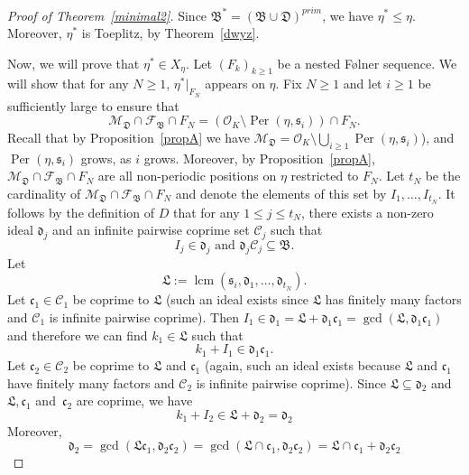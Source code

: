 \documentclass[leqno,a4paper,12pt]{article}
\DeclareMathOperator{\lcm}{lcm}
\theoremstyle{definition}
\newcommand{\Per}{\operatorname{Per}\nolimits}
\newcommand{\OK}{\mathcal{O}_K}
\begin{document}
\begin{proof}[Proof of Theorem~\ref{minimal2}]
Since $\mathfrak{B}^*=(\mathfrak{B}\cup\mathfrak{D})^{prim}$, we have  $\eta^*\leq\eta$. Moreover, $\eta^*$ is Toeplitz, by Theorem~\ref{dwyz}.

Now, we will prove that $\eta^*\in X_\eta$. Let $(F_k)_{k\geq1}$ be a nested F\o lner sequence. We will show that for any $N\geq 1$,  $\eta^*|_{F_N}$ appears on $\eta$. Fix $N\geq 1$ and let $i\geq1$ be sufficiently large to ensure that
\begin{equation}\label{righti}
 \mathcal{M}_\mathfrak{D}\cap\mathcal{F}_\mathfrak{B}\cap F_N=(\OK\setminus\Per(\eta,\mathfrak{s}_i))\cap F_N.
\end{equation}
Recall that by Proposition~\ref{propA} we have $\mathcal{M}_\mathfrak{D}=\OK\setminus \bigcup_{i\geq 1}\Per(\eta,\mathfrak{s}_i)$), and $\Per(\eta,\mathfrak{s}_i)$ grows, as $i$ grows. Moreover, by Proposition~\ref{propA}, $\mathcal{M}_\mathfrak{D}\cap\mathcal{F}_\mathfrak{B}\cap F_N$ are all non-periodic positions on $\eta$ restricted to $F_N$. Let $t_N$ be the cardinality of $\mathcal{M}_\mathfrak{D}\cap \mathcal{F}_\mathfrak{B}\cap F_N$ and denote the elements of this set by $I_1,\dots, I_{t_N}$. It follows by the definition of $D$ that for any $1\leq j\leq t_N$, there exists a non-zero ideal $\mathfrak{d}_j$ and an infinite pairwise coprime set $\mathcal{C}_j$ such that
\[
I_j\in \mathfrak{d}_j \text{ and }\mathfrak{d}_j\mathcal{C}_j\subseteq \mathfrak{B}.
\]
Let
\[
\mathfrak{L}:=\lcm(\mathfrak{s}_i,\mathfrak{d}_1,\dots,\mathfrak{d}_{t_N}).
\]
Let $\mathfrak{c}_1\in\mathcal{C}_1$ be coprime to $\mathfrak{L}$ (such an ideal exists since $\mathfrak{L}$ has finitely many factors and $\mathcal{C}_1$ is infinite pairwise coprime). Then $I_1\in\mathfrak{d}_1=\mathfrak{L}+\mathfrak{d}_1\mathfrak{c}_1=\gcd(\mathfrak{L},\mathfrak{d}_1\mathfrak{c}_1)$ and therefore we can find $k_1\in\mathfrak{L}$ such that
\[
k_1+I_1\in\mathfrak{d}_1\mathfrak{c}_1.
\]
Let $\mathfrak{c}_2\in\mathcal{C}_2$ be coprime to $\mathfrak{L}$ and $\mathfrak{c}_1$ (again, such an ideal exists because $\mathfrak{L}$ and $\mathfrak{c}_1$ have finitely many factors and $\mathcal{C}_2$ is infinite pairwise coprime). Since  $\mathfrak{L}\subseteq\mathfrak{d}_2$ and $\mathfrak{L},\mathfrak{c}_1$ and~$\mathfrak{c}_2$ are coprime, we have
\[
k_1+I_2\in \mathfrak{L}+\mathfrak{d}_2=\mathfrak{d}_2
\]
Moreover,
\[\mathfrak{d}_2=
\gcd(\mathfrak{L}\mathfrak{c}_1,\mathfrak{d}_2\mathfrak{c}_2)=\gcd(\mathfrak{L}\cap\mathfrak{c}_1,\mathfrak{d}_2\mathfrak{c}_2)=\mathfrak{L}\cap\mathfrak{c}_1+\mathfrak{d}_2\mathfrak{c}_2
\]
\end{proof}
\end{document}
